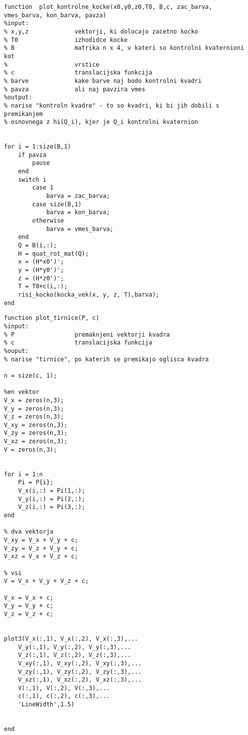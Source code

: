 \documentclass[12pt,a4paper,twoside]{article}
\theoremstyle{definition} %
\theoremstyle{plain} %
\numberwithin{equation}{section}  %
\begin{document}
\begin{lstlisting}[caption = {}]
function  plot_kontrolne_kocke(x0,y0,z0,T0, B,c, zac_barva, vmes_barva, kon_barva, pavza)
%input:
% x,y,z             vektorji, ki dolocajo zacetno kocko
% T0                izhodidce kocke
% B                 matrika n x 4, v kateri so kontrolni kvaternioni kot 
%                   vrstice
% c                 translacijska funkcija
% barve             kake barve naj bodo kontrolni kvadri
% pavza             ali naj pavzira vmes
%output:
% narise "kontroln kvadre" - to so kvadri, ki bi jih dobili s premikanjem
% osnovnega z hi(Q_i), kjer je Q_i kontrolni kvaternion


for i = 1:size(B,1)
    if pavza
        pause
    end
    switch i
        case 1
            barva = zac_barva;
        case size(B,1)
            barva = kon_barva;
        otherwise
            barva = vmes_barva;
    end
    Q = B(i,:);
    H = quat_rot_mat(Q);
    x = (H*x0')';
    y = (H*y0')';
    z = (H*z0')';
    T = T0+c(i,:);
    risi_kocko(kocka_vek(x, y, z, T),barva);
end
\end{lstlisting}

\begin{lstlisting}[caption = {}]
function plot_tirnice(P, c)
%input:
% P                 premaknjeni vektorji kvadra
% c                 translacijska funkcija
%ouput:
% narise "tirnice", po katerih se premikajo oglisca kvadra

n = size(c, 1);

%en vektor
V_x = zeros(n,3);
V_y = zeros(n,3);
V_z = zeros(n,3);
V_xy = zeros(n,3);
V_zy = zeros(n,3);
V_xz = zeros(n,3);
V = zeros(n,3);


for i = 1:n
    Pi = P{i};
    V_x(i,:) = Pi(1,:);
    V_y(i,:) = Pi(2,:);
    V_z(i,:) = Pi(3,:); 
end

% dva vektorja
V_xy = V_x + V_y + c;
V_zy = V_z + V_y + c;
V_xz = V_x + V_z + c;

% vsi
V = V_x + V_y + V_z + c;

V_x = V_x + c;
V_y = V_y + c;
V_z = V_z + c;


plot3(V_x(:,1), V_x(:,2), V_x(:,3),...
    V_y(:,1), V_y(:,2), V_y(:,3),...
    V_z(:,1), V_z(:,2), V_z(:,3),...
    V_xy(:,1), V_xy(:,2), V_xy(:,3),...
    V_zy(:,1), V_zy(:,2), V_zy(:,3),...
    V_xz(:,1), V_xz(:,2), V_xz(:,3),...
    V(:,1), V(:,2), V(:,3),...
    c(:,1), c(:,2), c(:,3),...
    'LineWidth',1.5)


end
\end{lstlisting}
\end{document}
